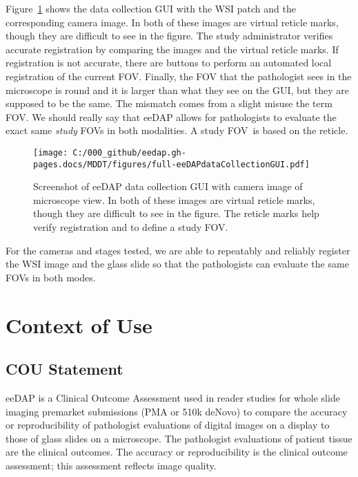 \documentclass{article}%
\begin{document}
Figure~\ref{fig_full-eeDAPdataCollectionGUI} shows the data collection GUI
with the WSI patch and the corresponding camera image. In both of these images
are virtual reticle marks, though they are difficult to see in the figure. The
study administrator verifies accurate registration by comparing the images and
the virtual reticle marks. If registration is not accurate, there are buttons
to perform an automated local registration of the current FOV. Finally, the
FOV that the pathologist sees in the microscope is round and it is larger than
what they see on the GUI, but they are supposed to be the same. The mismatch
comes from a slight misuse the term FOV. We should really say that eeDAP
allows for pathologists to evaluate the exact same \emph{study} FOVs in both
modalities. A study FOV\ is based on the reticle.

\begin{figure}[ptbh]
\label{fig_full-eeDAPdataCollectionGUI}
\texttt{[image: C:/000\_github/eedap.gh-pages.docs/MDDT/figures/full-eeDAPdataCollectionGUI.pdf]}\caption{Screenshot
of eeDAP data collection GUI with camera image of microscope view. In both of
these images are virtual reticle marks, though they are difficult to see in
the figure. The reticle marks help verify registration and to define a study
FOV.}%
\end{figure}

For the cameras and stages tested, we are able to repeatably and reliably
register the WSI image and the glass slide so that the pathologists can
evaluate the same FOVs in both modes.

\section{Context of Use}

\label{context-of-use}

\subsection{COU Statement}

eeDAP is a Clinical Outcome Assessment used in reader studies for whole slide
imaging premarket submissions (PMA or 510k deNovo) to compare the accuracy or
reproducibility of pathologist evaluations of digital images on a display to
those of glass slides on a microscope. The pathologist evaluations of patient
tissue are the clinical outcomes. The accuracy or reproducibility is the
clinical outcome assessment; this assessment reflects image quality.
\end{document}
